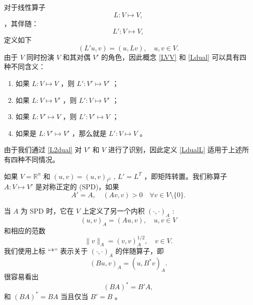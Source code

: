 \documentclass[12pt]{acta_2011xz}
\newcommand{\innerA}{(\cdot,\cdot)_A}
\begin{document}
对于线性算子 
   \begin{equation}
  \label{LVV}
L: V\mapsto V,
\end{equation}    ，其伴随：
   \begin{equation}
  \label{Ldual}
L': V\mapsto V,
\end{equation}    定义如下
   \begin{equation}
  \label{LdualL}
(L'u,v)=(u, Lv),\quad u,v\in V.   
\end{equation}    由于    $V$    同时扮演    $V$    和其对偶    $V'$    的角色，因此概念
   \eqref{LVV}    和    \eqref{Ldual}    可以具有四种不同含义：
   \begin{enumerate}[1.]

   \item   如果    $L: V\mapsto V$    ，则    $L': V'\mapsto V'$    ；   \item   如果    $L: V\mapsto V'$    ，则    $L': V\mapsto V'$    ；   \item   如果    $L: V'\mapsto V$    ，则    $L': V'\mapsto V$    ；   \item   如果是    $L: V'\mapsto V'$    ，那么就是    $L': V\mapsto V$    。  \end{enumerate}    由于我们通过
   \eqref{L2dual}    对    $V'$    和    $V$    进行了识别，因此定义    \eqref{LdualL}    适用于上述所有四种不同情况。  

如果    $V=\mathbb R^n$    和    $(u,v)=(u,v)_{\ell^2}$    ,    $L' = L^T$    ，即矩阵转置。我们称算子    $A:V\mapsto V'$    是对称正定的 (SPD)，如果 
   $$
A'=A, \quad (Av,v)>0\quad \forall v\in V\setminus \{ 0 \} .
$$     

当    $A$    为 SPD 时，它在    $V$    上定义了另一个内积    $(\cdot, \cdot)_A$    :
   $$
(u,v)_A=(Au,v),\quad u,v\in V
$$    和相应的范数 
   $$
\|v\|_A=(v,v)_A^{1/2}, \quad v\in V. 
$$    我们使用上标 ``*'' 表示关于    $\innerA$    的伴随算子，即 
   $$
(Bu, v)_A = (u, B^*v)_A. 
$$    很容易看出 
   \begin{equation}
  \label{BA}
 (BA)^* = B'A,
\end{equation}    和    $(BA)^* = BA$    当且仅当    $B'=B$    。  
\end{document}

